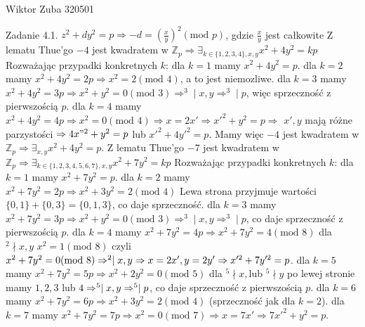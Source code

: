 \documentclass{article}
\begin{document}
Wiktor Zuba 320501
\newline

Zadanie 4.1.
\newline
\newline
$z^2+dy^2=p\Rightarrow -d=(\frac{x}{y})^2(\text{mod }p)$, gdzie $\frac{x}{y}$ jest całkowite\newline\newline
Z lematu Thue'go $-4$ jest kwadratem w $\mathbb{Z}_p\Rightarrow \exists_{k\in\{1,2,3,4\},x,y} x^2+4y^2=kp$\newline
Rozważając przypadki konkretnych $k$:\newline
dla $k=1$ mamy $x^2+4y^2=p$.\newline
dla $k=2$ mamy $x^2+4y^2=2p\Rightarrow x^2=2(\text{mod } 4)$, a to jest niemozliwe.\newline
dla $k=3$ mamy $x^2+4y^2=3p\Rightarrow x^2+y^2=0(\text{mod }3)\Rightarrow ^3\mid x,y\Rightarrow ^3\mid p$, więc sprzeczność z pierwszością $p$.\newline
dla $k=4$ mamy $x^2+4y^2=4p\Rightarrow x^2=0(\text{mod }4)\Rightarrow x=2x'\Rightarrow x'^2+y^2=p\Rightarrow$
$x',y$ mają różne parzystości $\Rightarrow 4x"^2+y^2=p$ lub $x'^2+4y'^2=p$.\newline
Mamy więc $-4$ jest kwadratem w $\mathbb{Z}_p\Rightarrow\exists_{x,y} x^2+4y^2=p$.\newline\newline
Z lematu Thue'go $-7$ jest kwadratem w $\mathbb{Z}_p\Rightarrow \exists_{k\in\{1,2,3,4,5,6,7\},x,y} x^2+7y^2=kp$\newline
Rozważając przypadki konkretnych $k$:\newline
dla $k=1$ mamy $x^2+7y^2=p$.\newline
dla $k=2$ mamy $x^2+7y^2=2p\Rightarrow x^2+3y^2=2(\text{mod }4)$ Lewa strona przyjmuje wartości $\{0,1\}+\{0,3\}=\{0,1,3\}$, co daje sprzeczność.\newline
dla $k=3$ mamy $x^2+7y^2=3p\Rightarrow x^2+y^2=0(\text{mod }3)\Rightarrow ^3\mid x,y\Rightarrow ^3\mid p$, co daje sprzeczność z pierwszością $p$.\newline
dla $k=4$ mamy $x^2+7y^2=4p\Rightarrow x^2+7y^2=4(\text{mod }8)$ dla $^2\nmid x,y$ $x^2=1(\text{mod }8)$ czyli $x^2+7y^2=0(\text{mod }8)\newline
\Rightarrow ^2\mid x,y\Rightarrow x=2x',y=2y'\Rightarrow x'^2+7y'^2=p$.\newline
dla $k=5$ mamy $x^2+7y^2=5p\Rightarrow x^2+2y^2=0(\text{mod }5)$ dla $^5\nmid x,$lub $^5\nmid y$ po lewej stronie mamy $1,2,3$ lub $4\newline
\Rightarrow ^5\mid x,y\Rightarrow ^5\mid p$,
co daje sprzeczność z pierwszością $p$.\newline
dla $k=6$ mamy $x^2+7y^2=6p\Rightarrow x^2+3y^2=2(\text{mod }4)$ (sprzeczność jak dla $k=2$).\newline
dla $k=7$ mamy $x^2+7y^2=7p\Rightarrow x^2=0(\text{mod }7)\Rightarrow x=7x'\Rightarrow 7x'^2+y^2=p$.\newline
\newline
\end{document}
